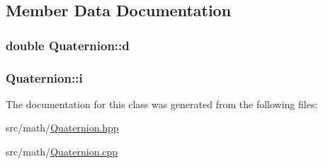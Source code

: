 \subsection{\-Member \-Data \-Documentation}
\hypertarget{classQuaternion_aece65eacbbafecc1d1db0eab1efbf0de}{
\subsubsection[{d}]{\setlength{\rightskip}{0pt plus 5cm}double {\bf \-Quaternion\-::d}}}\label{classQuaternion_aece65eacbbafecc1d1db0eab1efbf0de}
\hypertarget{classQuaternion_ae54b34d0a320d6efbfd90195d8103bab}{
\subsubsection[{i}]{ {\bf \-Quaternion\-::i}}}\label{classQuaternion_ae54b34d0a320d6efbfd90195d8103bab}


\-The documentation for this class was generated from the following files\-:\begin{DoxyCompactItemize}
\item 
src/math/\hyperlink{Quaternion_8hpp}{\-Quaternion.\-hpp}\item 
src/math/\hyperlink{Quaternion_8cpp}{\-Quaternion.\-cpp}\end{DoxyCompactItemize}
